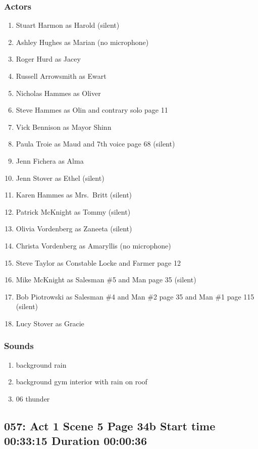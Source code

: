 \subsubsection{Actors}
\begin{enumerate}
\item Stuart Harmon as Harold (silent)
\item Ashley Hughes as Marian (no microphone)
\item Roger Hurd as Jacey
\item Russell Arrowsmith as Ewart
\item Nicholas Hammes as Oliver
\item Steve Hammes as Olin and contrary solo page 11
\item Vick Bennison as Mayor Shinn
\item Paula Troie as Maud and 7th voice page 68 (silent)
\item Jenn Fichera as Alma
\item Jenn Stover as Ethel (silent)
\item Karen Hammes as Mrs.~Britt (silent)
\item Patrick McKnight as Tommy (silent)
\item Olivia Vordenberg as Zaneeta (silent)
\item Christa Vordenberg as Amaryllis (no microphone)
\item Steve Taylor as Constable Locke and Farmer page 12
\item Mike McKnight as Salesman \#5 and Man page 35 (silent)
\item Bob Piotrowski as Salesman \#4 and Man \#2 page 35 and Man \#1 page 115 (silent)
\item Lucy Stover as Gracie
\end{enumerate}

\subsubsection{Sounds}
\begin{enumerate}
\item background rain
\item background gym interior with rain on roof
\item 06 thunder
\end{enumerate}
\subsection{057: Act 1 Scene 5 Page 34b Start time 00:33:15 Duration 00:00:36}

